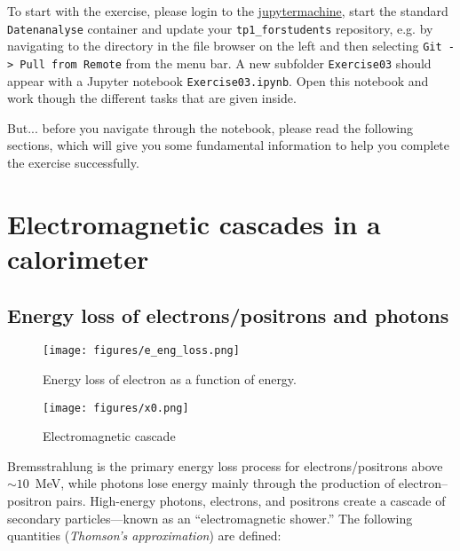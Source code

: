 \documentclass[a4paper,12pt]{article}
\begin{document}
\names %

To start with the exercise, please login to the \href{https://jupytermachine.etp.kit.edu}{jupytermachine}, start the standard \texttt{Datenanalyse} container and update your \texttt{tp1\_forstudents} repository, e.g. by navigating to the directory in the file browser on the left and then selecting \texttt{Git -> Pull from Remote} from the menu bar.
A new subfolder \texttt{Exercise03} should appear with a Jupyter notebook \texttt{Exercise03.ipynb}.
Open this notebook and work though the different tasks that are given inside.

But... before you navigate through the notebook, please read the following sections, which will give you some fundamental information to help you complete the exercise successfully.

\section{Electromagnetic cascades in a calorimeter}

\subsection{Energy loss of electrons/positrons and photons}

\begin{figure}[h]
    \centering
    \begin{minipage}{0.46\textwidth}
        \centering
        \texttt{[image: figures/e\_eng\_loss.png]}
        \caption{Energy loss of electron as a function of energy.}
    \end{minipage}%
    \hspace{0.05\textwidth}
    \begin{minipage}{0.46\textwidth}
        \centering
        \texttt{[image: figures/x0.png]}
        \caption{Electromagnetic cascade}
    \end{minipage}
\end{figure}

Bremsstrahlung is the primary energy loss process for electrons/positrons above \( \sim 10 \)~MeV, while photons lose energy mainly through the production of electron–positron pairs.
High-energy photons, electrons, and positrons create a cascade of secondary particles—known as an “electromagnetic shower.”
The following quantities (\textit{Thomson’s approximation}) are defined:
\end{document}
